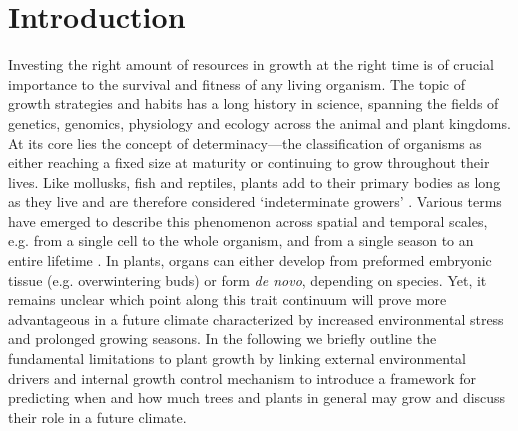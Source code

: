 \documentclass{article}
\begin{document}
\section*{Introduction}
		Investing the right amount of resources in growth at the right time is of crucial importance to the survival and fitness of any living organism. The topic of growth strategies and habits has a long history in science, spanning the fields of genetics, genomics, physiology and ecology across the animal and plant kingdoms. At its core lies the concept of determinacy---the classification of organisms as either reaching a fixed size at maturity or continuing to grow throughout their lives. Like mollusks, fish and reptiles, plants add to their primary bodies as long as they live and are therefore considered `indeterminate growers' \citep{ejsmondHowTimeGrowth2010}. Various terms have emerged to describe this phenomenon across spatial and temporal scales, e.g. from a single cell to the whole organism, and from a single season to an entire lifetime \citep{mcdanielInductionDeterminationDevelopmental1992a, karkachTrajectoriesModelsIndividual2006}. In plants, organs can either develop from preformed embryonic tissue (e.g. overwintering buds) or form \textit{de novo}, depending on species. Yet, it remains unclear which point along this trait continuum will prove more advantageous in a future climate characterized by increased environmental stress and prolonged growing seasons. In the following we briefly outline the fundamental limitations to plant growth by linking external environmental drivers and internal growth control mechanism to introduce a framework for predicting when and how much trees and plants in general may grow and discuss their role in a future climate.  \\
		
\end{document}
